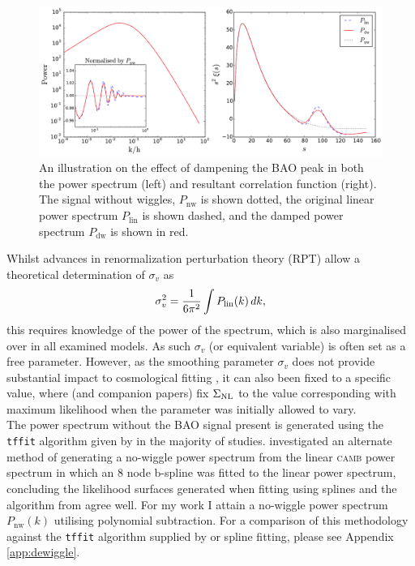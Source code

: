 \documentclass[titlesmallcaps, examinerscopy, copyrightpage]{uqthesis}
\newcommand{\camb}{\textsc{camb}}
\begin{document}
\begin{figure}[h!]
  \begin{center}
    \includegraphics[width=\textwidth]{images/dwExample.pdf}
  \end{center}
  \caption{An illustration on the effect of dampening the BAO peak in both the power spectrum (left) and resultant correlation function (right). The signal without wiggles, $P_{\mathrm{nw}}$ is shown dotted, the original linear power spectrum $P_{\mathrm{lin}}$ is shown dashed, and the damped power spectrum $P_{\mathrm{dw}}$ is shown in red.}
  \label{fig:dwExample}
\end{figure}



Whilst advances in renormalization perturbation theory (RPT)  \citep{CrocceScoccimarro2008} allow a theoretical determination of $\sigma_v$ as
\begin{align} \label{eq:sigmav}
\sigma_v^2 = \frac{1}{6\pi^2} \int P_{\rm{lin}}(k)\, dk,
\end{align}
this requires knowledge of the power of the spectrum, which is also marginalised over in all examined models. As such $\sigma_v$ (or equivalent variable) is often set as a free parameter. However, as the smoothing parameter $\sigma_v$ does not provide substantial impact to cosmological fitting \citep{ReidPercival2010, XuPadmanabhan2012}, it can also been fixed to a specific value, where \citet{XuPadmanabhan2012} (and companion papers) fix $\Sigma_{\rm{NL}}$ to the value corresponding with maximum likelihood when the parameter was initially allowed to vary.\\



The power spectrum without the BAO signal present is generated using the \verb;tffit; algorithm given by \citet{EisensteinHu1998} in the majority of studies. \citet{ReidPercival2010} investigated an alternate method of generating a no-wiggle power spectrum from the linear \camb{} power spectrum in which an 8 node b-spline was fitted to the linear power spectrum, concluding the likelihood surfaces generated when fitting using splines and the algorithm from \citet{EisensteinHu1998} agree well. For my work I attain a no-wiggle power spectrum $P_{\mathrm{nw}}(k)$ utilising polynomial subtraction. For a comparison of this methodology against the \verb;tffit; algorithm supplied by \citet{EisensteinHu1998} or spline fitting, please see Appendix \ref{app:dewiggle}.
\end{document}
